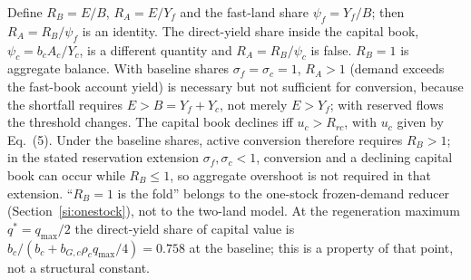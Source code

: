 \documentclass[11pt,a4paper]{article}
\begin{document}
Define $R_B=E/B$, $R_A=E/Y_f$ and the fast-land share $\psi_f=Y_f/B$; then $R_A=R_B/\psi_f$ is an identity. The direct-yield share inside the capital book, $\psi_c=b_cA_c/Y_c$, is a different quantity and $R_A=R_B/\psi_c$ is false. $R_B=1$ is aggregate balance. With baseline shares $\sigma_f=\sigma_c=1$, $R_A>1$ (demand exceeds the fast-book account yield) is necessary but not sufficient for conversion, because the shortfall requires $E>B=Y_f+Y_c$, not merely $E>Y_f$; with reserved flows the threshold changes. The capital book declines iff $u_c>R_{rc}$, with $u_c$ given by Eq.~(5). Under the baseline shares, active conversion therefore requires $R_B>1$; in the stated reservation extension $\sigma_f,\sigma_c<1$, conversion and a declining capital book can occur while $R_B\le1$, so aggregate overshoot is not required in that extension. ``$R_B=1$ is the fold'' belongs to the one-stock frozen-demand reducer (Section~\ref{si:onestock}), not to the two-land model. At the regeneration maximum $q^*=q_{\max}/2$ the direct-yield share of capital value is $b_c/(b_c+b_{G,c}\rho_cq_{\max}/4)=0.758$ at the baseline; this is a property of that point, not a structural constant.
\end{document}
